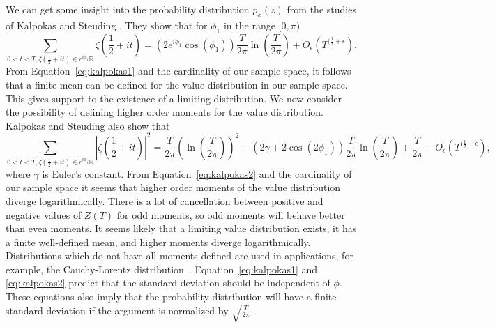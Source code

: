 \documentclass[twoside]{article}
\begin{document}
We can get some insight into the probability distribution $p_{\phi}(z)$ from the studies of 
Kalpokas and Steuding \cite{kalpokas 2009}. 
They show that for $\phi_1$ in the range $[0, \pi)$ 
\begin{equation}
\sum_{0 < t < T, \zeta(\frac{1}{2}+it) \in e^{i\phi_1}\mathbb{R}} \zeta(\frac{1}{2}+it) = (2e^{i\phi_1}\cos(\phi_1))\frac{T}{2\pi}\ln (\frac{T}{2\pi}) + O_\epsilon(T^{(\frac{1}{2}+\epsilon}).
\label{eq:kalpokas1}
\end{equation}
From Equation~\ref{eq:kalpokas1} and the cardinality of our sample space, it follows that a finite mean can be defined for the value distribution in our sample space. This gives support to the existence of a limiting distribution. We now consider the possibility of defining higher order moments for the value distribution. Kalpokas and Steuding  also show that
\begin{equation}
\sum_{0 < t < T, \zeta(\frac{1}{2}+it) \in e^{i\phi_1}\mathbb{R}} |\zeta(\frac{1}{2}+it)|^2 = \frac{T}{2\pi}(\ln (\frac{T}{2\pi}))^2 + (2\gamma+2\cos(2\phi_1))\frac{T}{2\pi}\ln (\frac{T}{2\pi}) + \frac{T}{2\pi} + O_\epsilon(T^{(\frac{1}{2}+\epsilon}),
\label{eq:kalpokas2}
\end{equation}
where $\gamma$ is Euler's constant. From Equation~\ref{eq:kalpokas2} and the cardinality of our sample space 
it seems that higher order moments of the value distribution diverge logarithmically. 
There is a lot of cancellation between positive and negative values of $Z(T)$ for odd moments, 
so odd moments will  behave better than even moments. It seems likely that a limiting value distribution exists, 
it has a finite well-defined mean, and higher moments diverge logarithmically. 
Distributions which do not have all moments defined are used in applications, for example, 
the Cauchy-Lorentz distribution~\cite{feller}. Equation~\ref{eq:kalpokas1} and \ref{eq:kalpokas2} 
predict that the standard deviation should be independent of $\phi$. 
These equations also imply that the probability distribution will have a finite standard deviation if the 
argument is normalized by $\sqrt{\frac{T}{2\pi}}$.
 
\end{document}
